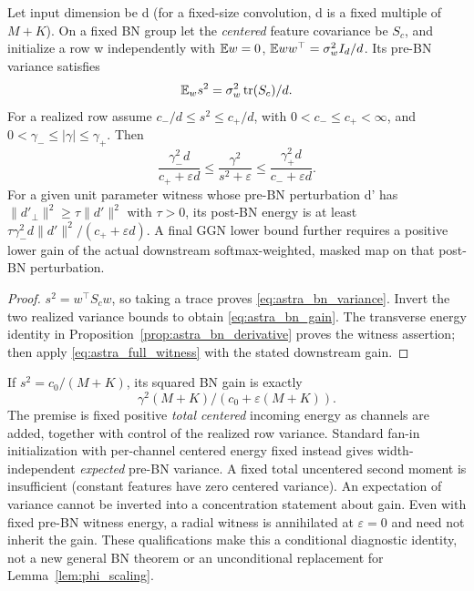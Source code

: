 \begin{proposition}
\label{prop:astra_bn_gain}
Let input dimension be d (for a fixed-size convolution, d is a fixed
multiple of $M+K$). On a fixed BN group let the \emph{centered} feature
covariance be $S_c$, and initialize a row w independently with
$\mathbb{E} w=0$, $\mathbb{E} ww^\top=\sigma_w^2 I_d/d$. Its pre-BN variance satisfies
\begin{equation}\label{eq:astra_bn_variance}
 \mathbb{E}_w s^2=\sigma_w^2\operatorname{tr}(S_c)/d.
\end{equation}
For a realized row assume $c_-/d\le s^2\le c_+/d$, with
$0<c_-\le c_+<\infty$, and
$0<\gamma_-\le|\gamma|\le\gamma_+$. Then
\begin{equation}\label{eq:astra_bn_gain}
 \frac{\gamma_-^2d}{c_++\varepsilon d}
 \le\frac{\gamma^2}{s^2+\varepsilon}
 \le\frac{\gamma_+^2d}{c_-+\varepsilon d}.
\end{equation}
For a given unit parameter witness whose pre-BN perturbation d' has
$\|d'_\perp\|^2\ge\tau\|d'\|^2$ with $\tau>0$, its post-BN energy
is at least
$\tau\gamma_-^2d\|d'\|^2/(c_++\varepsilon d)$.
A final GGN lower bound further requires a positive lower gain of the
actual downstream softmax-weighted, masked map on that post-BN perturbation.
\end{proposition}
\begin{proof}
$s^2=w^\top S_cw$, so taking a trace proves
\eqref{eq:astra_bn_variance}. Invert the two realized variance bounds
to obtain \eqref{eq:astra_bn_gain}. The transverse energy identity in
Proposition~\ref{prop:astra_bn_derivative} proves the witness assertion;
then apply \eqref{eq:astra_full_witness} with the stated downstream gain.
\end{proof}
\begin{remark}
If $s^2=c_0/(M+K)$, its squared BN gain is exactly
\[
 \gamma^2(M+K)/(c_0+\varepsilon(M+K)).
\]
The premise is fixed positive \emph{total centered} incoming energy as
channels are added, together with control of the realized row variance.
Standard fan-in initialization with per-channel centered energy fixed
instead gives width-independent \emph{expected} pre-BN variance.
A fixed total uncentered second moment is insufficient (constant
features have zero centered variance). An expectation of variance cannot
be inverted into a concentration statement about gain. Even with fixed
pre-BN witness energy, a radial witness is annihilated at
$\varepsilon=0$ and need not inherit the gain. These qualifications
make this a conditional diagnostic identity, not a new general BN theorem
or an unconditional replacement for Lemma~\ref{lem:phi_scaling}.
\end{remark}
